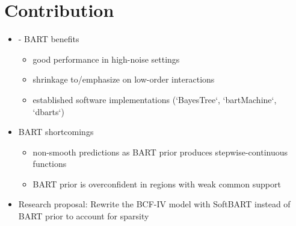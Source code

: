 \section{Contribution}

\begin{itemize}
    \item - BART benefits %
    \begin{itemize}
        \item good performance in high-noise settings 
        \item shrinkage to/emphasize on low-order interactions
        \item established software implementations (`BayesTree`, `bartMachine`, `dbarts`)
    \end{itemize}  
    \item BART shortcomings %
    \begin{itemize}
        \item non-smooth predictions as BART prior produces stepwise-continuous functions
        \item BART prior is overconfident in regions with weak common support
    \end{itemize}
    \item Research proposal: Rewrite the BCF-IV model with SoftBART instead of BART prior to account for sparsity
\end{itemize}
